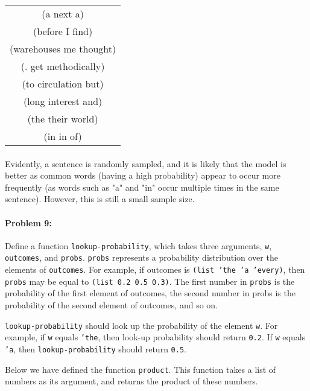 \documentclass[10pt]{article}
\begin{document}
\begin{center}
    \begin{tabular}{c}
         (a next a)\\
         (before I find)\\
         (warehouses me thought)\\
         (. get methodically)\\
         (to circulation but)\\
         (long interest and)\\
         (the their world)\\
         (in in of)\\
    \end{tabular}
\end{center}

\paragraph{} Evidently, a sentence is randomly sampled, and it is likely that the model is better as common words (having a high probability) appear to occur more frequently (as words such as "a" and "in" occur multiple times in the same sentence). However, this is still a small sample size.

\hrulefill
\paragraph{Problem 9:}

Define a function \texttt{lookup-probability}, which takes three
arguments, \texttt{w}, \texttt{outcomes}, and
\texttt{probs}. \texttt{probs} represents a probability distribution
over the elements of \texttt{outcomes}. For example, if outcomes is
\texttt{(list 'the 'a 'every)}, then \texttt{probs} may be equal to
\texttt{(list 0.2 0.5 0.3)}. The first number in \texttt{probs} is the
probability of the first element of outcomes, the second number in
probs is the probability of the second element of outcomes, and so on.

\texttt{lookup-probability} should look up the probability of the
element \texttt{w}. For example, if \texttt{w} equals \texttt{'the},
then look-up probability should return \texttt{0.2}. If \texttt{w}
equals \texttt{'a}, then \texttt{lookup-probability} should return
\texttt{0.5}.

Below we have defined the function \texttt{product}. This function takes a list
of numbers as its argument, and returns the product of these numbers.
\end{document}
